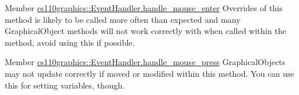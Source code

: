 \label{bug__bug000001}
\hypertarget{bug__bug000001}{}
 
\begin{DoxyDescription}
\item[Member \hyperlink{classcs110graphics_1_1EventHandler_a13af3268f8a1aa36b8483eb2deffef15}{cs110graphics::EventHandler.handle\_\-mouse\_\-enter} ]Overrides of this method is likely to be called more often than expected and many GraphicalObject methods will not work correctly with when called within the method, avoid using this if possible.


\end{DoxyDescription}

\label{bug__bug000002}
\hypertarget{bug__bug000002}{}
 
\begin{DoxyDescription}
\item[Member \hyperlink{classcs110graphics_1_1EventHandler_a547873123ebcd3fcc63a2e03d2a2fee3}{cs110graphics::EventHandler.handle\_\-mouse\_\-press} ]GraphicalObjects may not update correctly if moved or modified within this method. You can use this for setting variables, though.


\end{DoxyDescription}